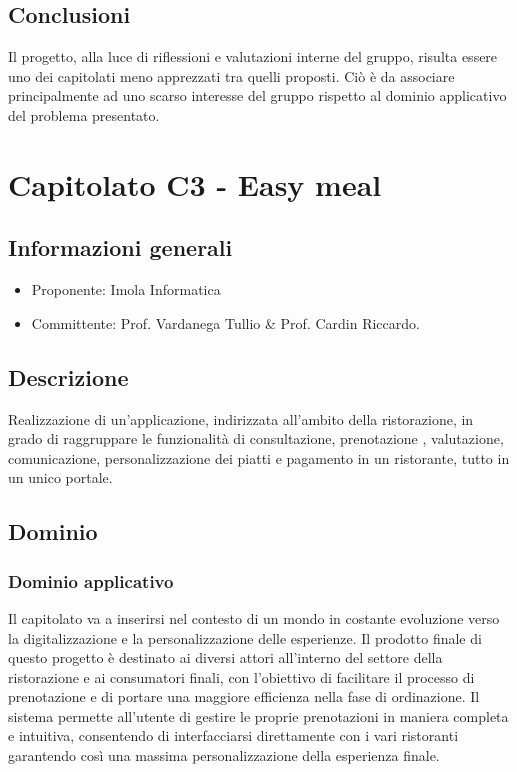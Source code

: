\documentclass[12pt]{report}
\begin{document}
\section{Conclusioni}
Il progetto, alla luce di riflessioni e valutazioni interne del gruppo, risulta essere uno dei capitolati meno apprezzati tra quelli proposti. Ciò è da associare principalmente ad uno scarso interesse del gruppo rispetto al dominio applicativo del problema presentato.

\chapter{Capitolato C3 - Easy meal}\label{chapter:3}
\section{Informazioni generali}
\begin{itemize}
    \item Proponente: Imola Informatica
    \item Committente: Prof. Vardanega Tullio \& Prof. Cardin Riccardo.
\end{itemize}

\section{Descrizione}
Realizzazione di un'applicazione, indirizzata all'ambito della ristorazione, in grado di raggruppare le funzionalità di consultazione, prenotazione , valutazione, comunicazione, personalizzazione dei piatti e pagamento in un ristorante, tutto in un unico portale.

\section{Dominio}
\subsection{Dominio applicativo}
Il capitolato va a inserirsi nel contesto di un mondo in costante evoluzione verso la digitalizzazione e la personalizzazione delle esperienze. Il prodotto finale di questo progetto è destinato ai diversi attori all'interno del settore della ristorazione e ai consumatori finali, con l'obiettivo di facilitare il processo di prenotazione e di portare una maggiore efficienza nella fase di ordinazione. Il sistema permette all'utente di gestire le proprie prenotazioni in maniera completa e intuitiva, consentendo di interfacciarsi direttamente con i vari ristoranti garantendo così una massima personalizzazione della esperienza finale.
\end{document}
